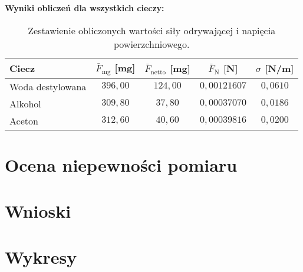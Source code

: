 \documentclass[a4paper,12pt]{article}
\begin{document}
\noindent\textbf{Wyniki obliczeń dla wszystkich cieczy:}

\begin{table}[H]
    \centering
    \begin{tabular}{|l|c|c|c|c|}
        \hline
        \textbf{Ciecz} & \textbf{$\bar{F}_{\text{mg}}$ [mg]} & \textbf{$\bar{F}_{\text{netto}}$ [mg]} & \textbf{$\bar{F}_{\text{N}}$ [N]} & \textbf{$\sigma$ [N/m]} \\
        \hline
        Woda destylowana & $396{,}00$ & $124{,}00$ & $0{,}00121607$ & $0{,}0610$ \\
        \hline
        Alkohol & $309{,}80$ & $37{,}80$ & $0{,}00037070$ & $0{,}0186$ \\
        \hline
        Aceton & $312{,}60$ & $40{,}60$ & $0{,}00039816$ & $0{,}0200$ \\
        \hline
    \end{tabular}
    \caption{Zestawienie obliczonych wartości siły odrywającej i napięcia powierzchniowego.}
    \label{tab:wyniki_obliczen_odrywanie}
\end{table}

\section{Ocena niepewności pomiaru}

\section{Wnioski}

\section{Wykresy}



\end{document}
